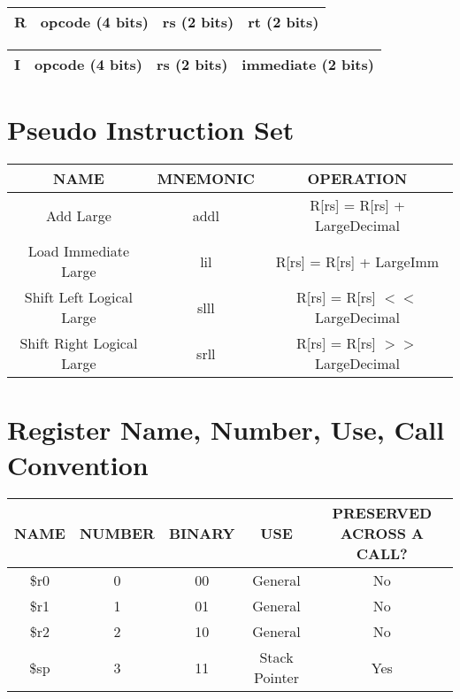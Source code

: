 \documentclass[12pt]{article}
\begin{document}
\begin{center}
\begin{tabular}{ |c|c|c|c| } 
 \hline
 R & opcode (4 bits) & rs (2 bits) & rt (2 bits) \\ 
 \hline

\end{tabular}
\end{center}

\begin{center}
\begin{tabular}{ |c|c|c|c| } 
\hline
 I & opcode (4 bits) & rs (2 bits) & immediate (2 bits)\\ 
 \hline
 \end{tabular}
\end{center}



\section*{Pseudo Instruction Set}
\begin{center}
\begin{tabular}{ |c|c|c| } 
 \hline
 NAME & MNEMONIC & OPERATION \\ 
 \hline
 Add Large & addl & R[rs] = R[rs] + LargeDecimal   \\ 
  \hline
 Load Immediate Large & lil & R[rs] = R[rs] + LargeImm \\ 
  \hline
 Shift Left Logical Large & slll & R[rs] = R[rs] $<$$<$ LargeDecimal \\
  \hline 
 Shift Right Logical Large & srll &  R[rs] = R[rs] $>$$>$ LargeDecimal \\ 
 \hline
\end{tabular}
\end{center}

\section*{Register Name, Number, Use, Call Convention}
\begin{center}
\begin{tabular}{ |c|c|c|c|c| } 
\hline
 NAME & NUMBER & BINARY & USE & PRESERVED ACROSS A CALL?\\ 
 \hline
 \$r0 & 0 & 00 &  General & No \\ 
  \hline
 \$r1 & 1 & 01 & General & No \\ 
  \hline
 \$r2 & 2 & 10 & General & No\\
  \hline 
 \$sp & 3 & 11 	& Stack Pointer & Yes\\ 
 \hline
\end{tabular}
\end{center}
\end{document}
